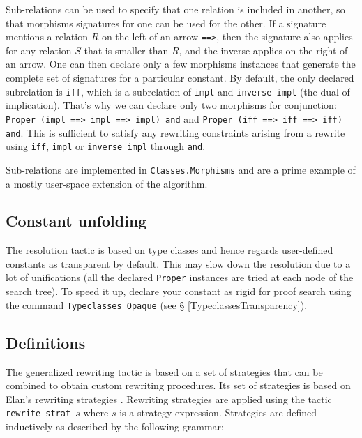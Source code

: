 Sub-relations can be used to specify that one relation is included in
another, so that morphisms signatures for one can be used for the other.
If a signature mentions a relation $R$ on the left of an arrow
\texttt{==>}, then the signature also applies for any relation $S$ that
is smaller than $R$, and the inverse applies on the right of an arrow. 
One can then declare only a few morphisms instances that generate the complete set
of signatures for a particular constant. By default, the only declared
subrelation is \texttt{iff}, which is a subrelation of \texttt{impl}
and \texttt{inverse impl} (the dual of implication). That's why we can
declare only two morphisms for conjunction:
\texttt{Proper (impl ==> impl ==> impl) and} and 
\texttt{Proper (iff ==> iff ==> iff) and}. This is sufficient to satisfy
any rewriting constraints arising from a rewrite using \texttt{iff},
\texttt{impl} or \texttt{inverse impl} through \texttt{and}.

Sub-relations are implemented in \texttt{Classes.Morphisms} and are a 
prime example of a mostly user-space extension of the algorithm.

\subsection{Constant unfolding}

The resolution tactic is based on type classes and hence regards user-defined 
constants as transparent by default. This may slow down the resolution
due to a lot of unifications (all the declared \texttt{Proper}
instances are tried at each node of the search tree).
To speed it up, declare your constant as rigid for proof search
using the command \texttt{Typeclasses Opaque} (see \S
\ref{TypeclassesTransparency}).


\subsection{Definitions}
The generalized rewriting tactic is based on a set of strategies that
can be combined to obtain custom rewriting procedures. Its set of
strategies is based on Elan's rewriting strategies
\cite{Luttik97specificationof}. Rewriting strategies are applied using
the tactic \texttt{rewrite\_strat $s$} where $s$ is a strategy
expression. Strategies are defined inductively as described by the
following grammar:

\def\str#1{\texttt{#1}}

